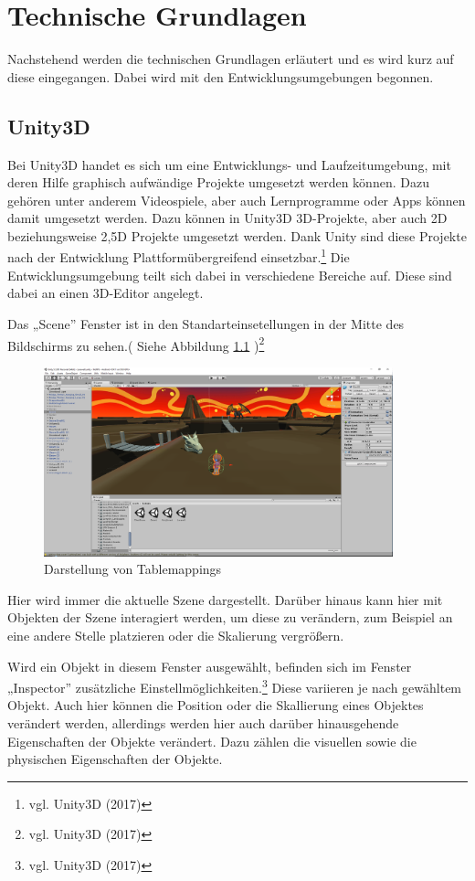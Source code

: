 \chapter{Technische Grundlagen}
	Nachstehend werden die technischen Grundlagen erläutert und es wird kurz auf diese eingegangen. Dabei wird mit den Entwicklungsumgebungen begonnen.

\section{Unity3D}
Bei Unity3D handet es sich um eine Entwicklungs- und Laufzeitumgebung, mit deren Hilfe graphisch aufwändige Projekte umgesetzt werden können. Dazu gehören unter anderem Videospiele, aber auch Lernprogramme oder Apps können damit umgesetzt werden. Dazu können in Unity3D 3D-Projekte, aber auch 2D beziehungsweise 2,5D Projekte umgesetzt werden. Dank Unity sind diese Projekte nach der Entwicklung Plattformübergreifend einsetzbar.\footnote{vgl. Unity3D \cite{unity1} (2017)} Die Entwicklungsumgebung teilt sich dabei in verschiedene Bereiche auf. Diese sind dabei an einen 3D-Editor angelegt.

Das „Scene” Fenster ist in den Standarteinsetellungen in der Mitte des Bildschirms zu sehen.( Siehe Abbildung \ref{scene} )\footnote{vgl. Unity3D \cite{unity2} (2017)} 

\begin{figure}[htbp]
\centering 
\label{scene}
\includegraphics[width=0.9\textwidth]{pics/unity3d_ui.png}
\caption{Darstellung von Tablemappings}
\end{figure}

Hier wird immer die aktuelle Szene dargestellt. Darüber hinaus kann hier mit Objekten der Szene interagiert werden, um diese zu verändern, zum Beispiel an eine andere Stelle platzieren oder die Skalierung vergrößern.

Wird ein Objekt in diesem Fenster ausgewählt, befinden sich im Fenster „Inspector” zusätzliche Einstellmöglichkeiten.\footnote{vgl. Unity3D \cite{unity3} (2017)} 
Diese variieren je nach gewähltem Objekt. Auch hier können die Position oder die Skallierung eines Objektes verändert werden, allerdings werden hier auch darüber hinausgehende Eigenschaften der Objekte verändert. Dazu zählen die visuellen sowie die physischen Eigenschaften der Objekte. 

